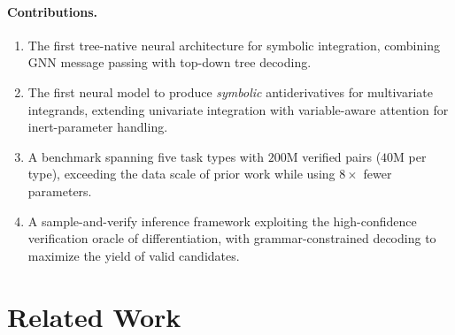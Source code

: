 \documentclass{article}
\begin{document}
\paragraph{Contributions.}
\begin{enumerate}
	\item The first tree-native neural architecture for symbolic integration,
	      combining GNN message passing with top-down tree decoding.
	\item The first neural model to produce \emph{symbolic} antiderivatives
	      for multivariate integrands, extending univariate integration with
	      variable-aware attention for inert-parameter handling.
	\item A benchmark spanning five task types with
	      $200$M verified pairs ($40$M per type), exceeding the data scale
	      of prior work while using $8\times$ fewer parameters.
	\item A sample-and-verify inference framework exploiting the
	      high-confidence verification oracle of differentiation, with
	      grammar-constrained decoding to maximize the yield of valid
	      candidates.
\end{enumerate}


\section{Related Work}
\label{sec:related}
\end{document}
